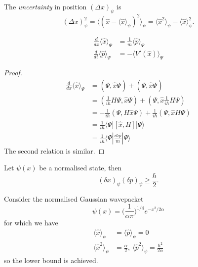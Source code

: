 \documentclass[a4paper]{article}
\theoremstyle{definition}
\begin{document}
\begin{eg}
\begin{itemize}
\end{itemize}
\end{eg}

\begin{defi}[Uncertainty]
  The \emph{uncertainty} in position \((\Delta x)_\psi\) is
  \[
(\Delta x)_\psi^2 = \langle (\hat x - \langle \hat x \rangle_\psi)^2\rangle_\psi = \langle \hat x^2 \rangle_\psi - \langle \hat x\rangle_\psi^2.
  \]
\end{defi}

\begin{thm}
  \begin{align*}
    \frac{d}{dx} \langle \hat x\rangle_\Psi &= \frac{1}{m} \langle \hat p\rangle_\Psi \\
    \frac{d}{dt}\langle \hat p\rangle_\Psi &= - \langle V'(\hat x)\rangle_\Psi
  \end{align*}
\end{thm}

\begin{proof}
  \begin{align*}
    \frac{d}{dx}\langle\hat x\rangle_\Psi &= (\dot\Psi, \hat x \Psi) + (\Psi,\hat x\dot\Psi) \\
                                          &= (\frac{1}{i\hbar}H\Psi,\hat x\Psi) + (\Psi, \hat x \frac{1}{i\hbar}H\Psi) \\
                                          &= -\frac{1}{i\hbar}(\Psi,H\hat x\Psi) + \frac{1}{i\hbar}(\Psi, \hat x H \Psi) \\
                                          &= \frac{1}{i\hbar} \langle\Psi|[\hat x, H]|\Psi\rangle \\
                                          &= \frac{1}{i\hbar} \langle\Psi| \frac{i\hbar\hat p}{m}|\Psi\rangle
  \end{align*}
  The second relation is similar.
\end{proof}

\begin{thm}
  Let \(\psi(x)\) be a normalised state, then
  \[
(\delta x)_\psi (\delta p)_\psi \geq \frac{\hbar}{2}.
  \]
\end{thm}

\begin{eg}
  Consider the normalised Gaussian wavepacket
  \[
    \psi(x) = \Big( \frac{1}{\alpha\pi} \Big)^{1/4} e^{-x^2/2\alpha}
  \]
  for which we have
  \begin{align*}
    \langle\hat x\rangle_\psi &= \langle\hat p\rangle_\psi = 0 \\
    \langle\hat x^2\rangle_\psi &= \frac{\alpha}{2} ,\: \langle\hat p^2\rangle_\psi = \frac{\hbar^2}{2\alpha}
  \end{align*}
  so the lower bound is achieved.
\end{eg}
\end{document}
